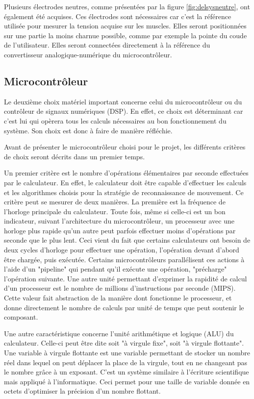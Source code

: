 \documentclass[letterpaper, twoside, 12pt, memoire, creativecommons, hyperref]{thETS}
\begin{document}
Plusieurs électrodes neutres, comme présentées par la figure \ref{fig:delsysneutre}, ont également été acquises. Ces électrodes sont nécessaires car c'est la référence utilisée pour mesurer la tension acquise sur les muscles. Elles seront positionnées sur une partie la moins charnue possible, comme par exemple la pointe du coude de l'utilisateur. Elles seront connectées directement à la référence du convertisseur analogique-numérique du microcontrôleur.

\subsection{Microcontrôleur}\label{ch:microcon}

Le deuxième choix matériel important concerne celui du microcontrôleur ou du contrôleur de signaux numériques (DSP). En effet, ce choix est déterminant car c'est lui qui opèrera tous les calculs nécessaires au bon fonctionnement du système. Son choix est donc à faire de manière réfléchie. 

Avant de présenter le microcontrôleur choisi pour le projet, les différents critères de choix seront décrits dans un premier temps. 

Un premier critère est le nombre d'opérations élémentaires par seconde effectuées par le calculateur. En effet, le calculateur doit être capable d'effectuer les calculs et les algorithmes choisis pour la stratégie de reconnaissance de mouvement. Ce critère peut se mesurer de deux manières. La première est la fréquence de l'horloge principale du calculateur. Toute fois, même si celle-ci est un bon indicateur, suivant l'architecture du microcontrôleur, un processeur avec une horloge plus rapide qu'un autre peut parfois effectuer moins d'opérations par seconde que le plus lent. Ceci vient du fait que certains calculateurs ont besoin de deux cycles d'horloge pour effectuer une opération, l'opération devant d'abord être chargée, puis exécutée. Certains microcontrôleurs parallélisent ces actions à l'aide d'un "pipeline" qui pendant qu'il exécute une opération, "précharge" l'opération suivante. Une autre unité permettant d'exprimer la rapidité de calcul d'un processeur est le nombre de millions d'instructions par seconde (MIPS). Cette valeur fait abstraction de la manière dont fonctionne le processeur, et donne directement le nombre de calculs par unité de temps que peut soutenir le composant.

Une autre caractéristique concerne l'unité arithmétique et logique (ALU) du calculateur. Celle-ci peut être dite soit "à virgule fixe", soit "à virgule flottante". Une variable à virgule flottante est une variable permettant de stocker un nombre réel dans lequel on peut déplacer la place de la virgule, tout en ne changeant pas le nombre grâce à un exposant. C'est un système similaire à l'écriture scientifique mais appliqué à l'informatique. Ceci permet pour une taille de variable donnée en octets d'optimiser la précision d'un nombre flottant.
\end{document}
